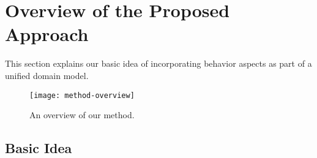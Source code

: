 \section{Overview of the Proposed Approach}
\label{sect:overviewApproach}

This section explains our basic idea of incorporating behavior aspects as part of a unified domain model.

\begin{figure}[ht]
	\begin{center}
		\texttt{[image: method-overview]}
	\end{center}
	\caption{An overview of our method.} %
	\label{fig:method-overview}
\end{figure}

\subsection{Basic Idea}

